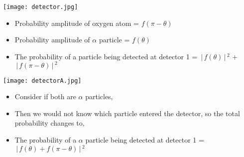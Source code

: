 \documentclass[aspectratio=169]{beamer}
\begin{document}
\begin{frame}{}


	\begin{multicols}{2}
 
		 \texttt{[image: detector.jpg]}
 
	\columnbreak
	
		\begin{itemize}
	
			\item Probability amplitude of oxygen atom = $f(\pi-\theta)$ \newline
			\item Probability amplitude of $\alpha$ particle = $f(\theta)$ \newline
			\item The probability of a particle being detected at detector 1 = $ \,\Bigr\rvert\,f(\theta) \,\Bigr\rvert\,^{2} $ + $ \,\Bigr\rvert\,f(\pi - \theta) \,\Bigr\rvert\,^{2} $
		
 		\end{itemize}
 	
	\end{multicols}
	
	
\end{frame}

\begin{frame}

	\begin{multicols}{2}
	
 		 \texttt{[image: detectorA.jpg]}

 
	\columnbreak
	
		\begin{itemize}

			\item Consider if both are $ \alpha $ particles, \newline
			\item Then we would not know which particle entered the detector, so the total probability changes to,  \newline
			\item  The probability of a $ \alpha $ particle 
		being detected at detector 1 = $ \,\Bigr\rvert\,f(\theta) + f(\pi - \theta) \,\Bigr\rvert\,^{2} $
		
		\end{itemize}
	
	\end{multicols}
 	
\end{frame}
\end{document}
